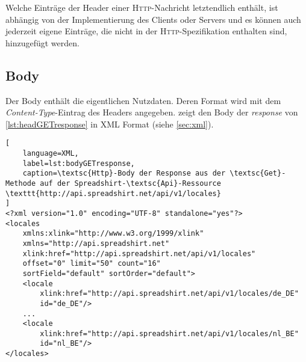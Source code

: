 Welche Einträge der Header einer \textsc{Http}-Nachricht letztendlich enthält, ist abhängig von der Implementierung des Clients oder Servers und es können auch jederzeit eigene Einträge, die nicht in der \textsc{Http}-Spezifikation enthalten sind, hinzugefügt werden.

\subsection{Body}
\label{sec:http-body}

Der Body enthält die eigentlichen Nutzdaten. Deren Format wird mit dem \emph{Content-Type}-Eintrag des Headers angegeben.  zeigt den Body der \emph{response} von \cref{lst:headGETresponse} in \gls{XML} Format (siehe \cref{sec:xml}).

\begin{minipage}{\textwidth}
\begin{lstlisting}[
    language=XML,
    label=lst:bodyGETresponse,
    caption=\textsc{Http}-Body der Response aus der \textsc{Get}-Methode auf der Spreadshirt-\textsc{Api}-Ressource \texttt{http://api.spreadshirt.net/api/v1/locales}
]
<?xml version="1.0" encoding="UTF-8" standalone="yes"?>
<locales 
    xmlns:xlink="http://www.w3.org/1999/xlink" 
    xmlns="http://api.spreadshirt.net" 
    xlink:href="http://api.spreadshirt.net/api/v1/locales" 
    offset="0" limit="50" count="16" 
    sortField="default" sortOrder="default">
    <locale 
        xlink:href="http://api.spreadshirt.net/api/v1/locales/de_DE" 
        id="de_DE"/>
    ...
    <locale 
        xlink:href="http://api.spreadshirt.net/api/v1/locales/nl_BE" 
        id="nl_BE"/>
</locales>
\end{lstlisting}
\end{minipage}